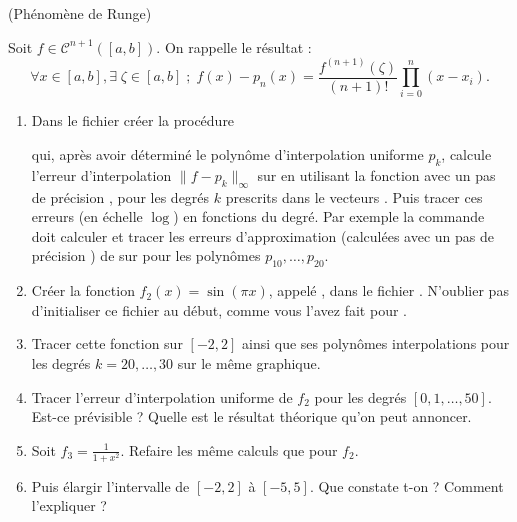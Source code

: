 \documentclass[a4paper,12pt,reqno]{amsart}
\begin{document}
\begin{exo} (Phénomène de Runge)

  Soit $f \in {\mathcal{C}}^{n+1}([a,b])$. On rappelle le résultat :
  $$
    \forall x \in [a,b], \exists \; \zeta \in [a,b] \; ; \;  f(x)-p_n(x)=\frac{f^{(n+1)}(\zeta)}{(n+1)!} \prod_{i=0}^n (x-x_i).
  $$

  \begin{enumerate}
    \item Dans le fichier  créer la procédure
    \begin{center}
    \end{center}
    qui, après avoir déterminé le polynôme d'interpolation uniforme $p_k$, calcule l'erreur d'interpolation $\| f - p_{k} \|_{\infty}$ sur \sclb{[-a,a]} en utilisant la fonction  avec un pas de précision , pour les degrés $k$ prescrits dans le vecteurs . Puis tracer ces erreurs (en échelle $\log$) en fonctions du degré.\newline
    Par exemple la commande  doit calculer et tracer les erreurs d'approximation (calculées avec un pas de précision ) de  sur \sclb{[-3,3]} pour les polynômes $p_{10},\ldots,p_{20}$.

    \item Créer la fonction $f_{2}(x)=\sin(\pi x)$, appelé , dans le fichier . N'oublier pas d'initialiser ce fichier au début, comme vous l'avez fait pour .

    \item Tracer cette fonction sur $[-2,2]$ ainsi que ses polynômes interpolations pour les degrés $k=20,\ldots,30$ sur le même graphique.

    \item Tracer l'erreur d'interpolation uniforme de $f_{2}$ pour les degrés $[0,1,\ldots,50]$. Est-ce prévisible ? Quelle est le résultat théorique qu'on peut annoncer.

    \item Soit $f_{3}=\frac{1}{1+x^{2}}$. Refaire les même calculs que pour $f_{2}$.

    \item Puis élargir l'intervalle de $[-2,2]$ à $[-5,5]$. Que constate t-on ? Comment l'expliquer ?
  \end{enumerate}
\end{exo}
\end{document}
